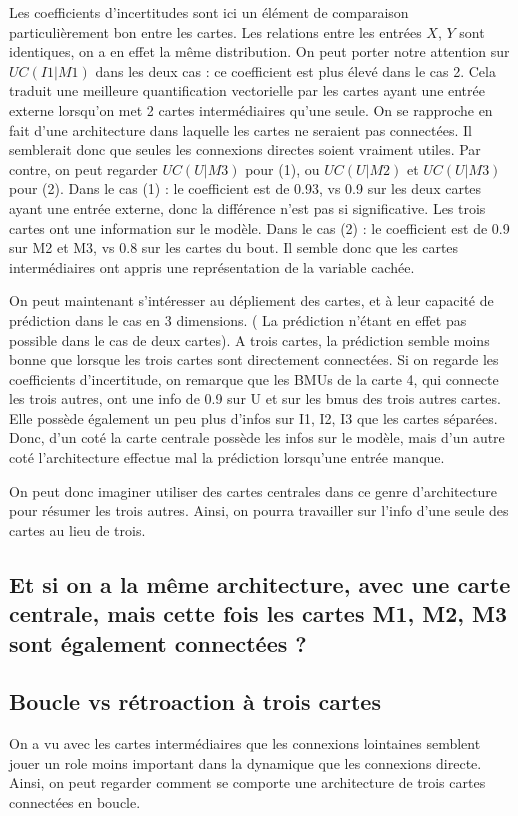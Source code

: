 Les coefficients d'incertitudes sont ici un élément de comparaison particulièrement bon entre les cartes. Les relations entre les entrées $X$, $Y$ sont identiques, on a en effet la même distribution. 
On peut porter notre attention sur $UC(I1|M1)$ dans les deux cas : ce coefficient est plus élevé dans le cas 2.
Cela traduit une meilleure quantification vectorielle par les cartes ayant une entrée externe lorsqu'on met 2 cartes intermédiaires qu'une seule. On se rapproche en fait d'une architecture dans laquelle les cartes ne seraient pas connectées. Il semblerait donc que seules les connexions directes soient vraiment utiles. 
Par contre, on peut regarder $UC(U|M3)$ pour (1), ou $UC(U|M2)$ et $UC(U|M3)$ pour (2). 
Dans le cas (1) : le coefficient est de 0.93, vs 0.9 sur les deux cartes ayant une entrée externe, donc la différence n'est pas si significative. Les trois cartes ont une information sur le modèle.
Dans le cas (2) : le coefficient est de 0.9 sur M2 et M3, vs 0.8 sur les cartes du bout. Il semble donc que les cartes intermédiaires ont appris une représentation de la variable cachée.

On peut maintenant s'intéresser au dépliement des cartes, et à leur capacité de prédiction dans le cas en 3 dimensions. ( La prédiction n'étant en effet pas possible dans le cas de deux cartes). A trois cartes, la prédiction semble moins bonne que lorsque les trois cartes sont directement connectées. 
Si on regarde les coefficients d'incertitude, on remarque que les BMUs de la carte 4, qui connecte les trois autres, ont une info de 0.9 sur U et sur les bmus des trois autres cartes. Elle possède également un peu plus d'infos sur I1, I2, I3 que les cartes séparées. 
Donc, d'un coté la carte centrale possède les infos sur le modèle, mais d'un autre coté l'architecture effectue mal la prédiction lorsqu'une entrée manque. 

On peut donc imaginer utiliser des cartes centrales dans ce genre d'architecture pour résumer les trois autres. Ainsi, on pourra travailler sur l'info d'une seule des cartes au lieu de trois.

\subsection{Et si on a la même architecture, avec une carte centrale, mais cette fois les cartes M1, M2, M3 sont également connectées ?}



\subsection{Boucle vs rétroaction à trois cartes}
On a vu avec les cartes intermédiaires que les connexions lointaines semblent jouer un role moins important dans la dynamique que les connexions directe. Ainsi, on peut regarder comment se comporte une architecture de trois cartes connectées en boucle.

